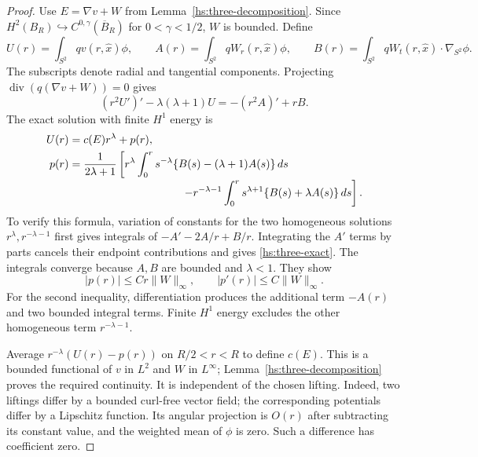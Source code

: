 \begin{proof}
Use $E=\nabla v+W$ from Lemma~\ref{hs:three-decomposition}.  Since
$H^2(B_R)\hookrightarrow C^{0,\gamma}(\overline B_R)$ for
$0<\gamma<1/2$, $W$ is bounded.  Define
\begin{equation}
 U(r)=\int_{S^2}qv(r,\widehat x)\phi,\qquad
 A(r)=\int_{S^2}qW_r(r,\widehat x)\phi,\qquad
 B(r)=\int_{S^2}qW_t(r,\widehat x)\cdot\nabla_{S^2}\phi.
 \label{hs:three-projections}
\end{equation}
The subscripts denote radial and tangential components.  Projecting
$\operatorname{div}(q(\nabla v+W))=0$ gives
\begin{equation}
 (r^2U')'-\lambda(\lambda+1)U=-(r^2A)'+rB.
 \label{hs:three-radial}
\end{equation}
The exact solution with finite $H^1$ energy is
\begin{align}
 U(r)&=c(E)r^\lambda+p(r),\notag\\
 p(r)&=\frac{1}{2\lambda+1}\left[
 r^\lambda\int_0^rs^{-\lambda}\{B(s)-(\lambda+1)A(s)\}\,ds
 \right.\notag\\[-2pt]
 &\hspace{36mm}\left.
 -r^{-\lambda-1}\int_0^rs^{\lambda+1}\{B(s)+\lambda A(s)\}\,ds
 \right].
 \label{hs:three-exact}
\end{align}
To verify this formula, variation of constants for the two homogeneous
solutions $r^\lambda,r^{-\lambda-1}$ first gives integrals of
$-A'-2A/r+B/r$.  Integrating the $A'$ terms by parts cancels their
endpoint contributions and gives \eqref{hs:three-exact}.
The integrals converge because $A,B$ are bounded and $\lambda<1$.
They show
\begin{equation}
 |p(r)|\leq Cr\|W\|_\infty,\qquad
 |p'(r)|\leq C\|W\|_\infty.
 \label{hs:three-particular-bound}
\end{equation}
For the second inequality, differentiation produces the additional
term $-A(r)$ and two bounded integral terms.  Finite $H^1$ energy
excludes the other homogeneous term $r^{-\lambda-1}$.

Average $r^{-\lambda}(U(r)-p(r))$ on $R/2<r<R$ to define $c(E)$.
This is a bounded functional of $v$ in $L^2$ and $W$ in $L^\infty$;
Lemma~\ref{hs:three-decomposition} proves the required continuity.
It is independent of the chosen lifting.  Indeed, two liftings
differ by a bounded curl-free vector field; the corresponding
potentials differ by a Lipschitz function.  Its angular projection
is $O(r)$ after subtracting its constant value, and the weighted
mean of $\phi$ is zero.  Such a difference has coefficient zero.


\end{proof}

